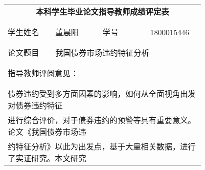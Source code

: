 \begin{table}[h]
	\centering
	\begin{tabular}{|p{0.2\linewidth}p{0.2\linewidth}p{0.2\linewidth}p{0.2\linewidth}|}
		\hline
		\multicolumn{4}{|c|}{\large\textbf{本科学生毕业论文指导教师成绩评定表}}                                                      \\
		\multicolumn{4}{|c|}{}                                                                                        \\
		\hline
		\multicolumn{1}{|l|}{}         & \multicolumn{1}{|l|}{} & \multicolumn{1}{|l|}{}              & \multicolumn{1}{|l|}{} \\
		\multicolumn{1}{|l|}{学生姓名} & \multicolumn{1}{|l|}{董晨阳} & \multicolumn{1}{|l|}{学号}          & \multicolumn{1}{|l|}{1800015446} \\
		\multicolumn{1}{|l|}{}         & \multicolumn{1}{|l|}{} & \multicolumn{1}{|l|}{}              & \multicolumn{1}{|l|}{} \\
		\hline
		\multicolumn{1}{|l|}{}         &                        &                                     &                        \\
		\multicolumn{1}{|l|}{论文题目} &  \multicolumn{3}{|l|}{我国债券市场违约特征分析}                        \\
		\multicolumn{1}{|l|}{}         &                        &                                     &                        \\
		\hline
		\multicolumn{4}{|l|}{}                                                                                                 \\
		\multicolumn{4}{|l|}{指导教师评阅意见：}                                                                               \\
		\multicolumn{4}{|l|}{}                                                                                                 \\
		\multicolumn{4}{|l|}{}                                                                                                 \\
      \multicolumn{4}{|l|}{
      \qquad 债券违约受到多方面因素的影响，如何从全面视角出发对债券违约特征

      }\\
      \multicolumn{4}{|l|}{
      进行综合评价，对于债券违约的预警等具有重要意义。论文《我国债券市场违

      }\\
      \multicolumn{4}{|l|}{
      约特征分析》以此为出发点，基于大量相关数据，进行了实证研究。本文研究

}
\end{tabular}
\end{table}
